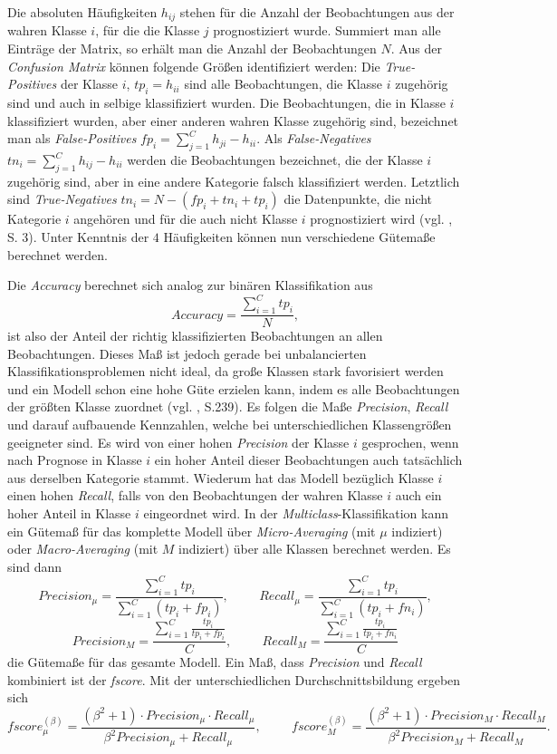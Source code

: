 \documentclass[a4paper,11pt]{article}
\begin{document}
Die absoluten Häufigkeiten $h_{ij}$ stehen für die Anzahl der Beobachtungen aus der wahren Klasse $i$, für die die Klasse $j$ prognostiziert wurde. Summiert man alle Einträge der Matrix, so erhält man die Anzahl der Beobachtungen $N$. Aus der \textit{Confusion Matrix} können folgende Größen identifiziert werden: Die \textit{True-Positives} der Klasse $i$, $tp_i = h_{ii}$ sind alle Beobachtungen, die Klasse $i$ zugehörig sind und auch in selbige klassifiziert wurden. Die Beobachtungen, die in Klasse $i$ klassifiziert wurden, aber einer anderen wahren Klasse zugehörig sind, bezeichnet man als \textit{False-Positives} $fp_i = \sum_{j = 1}^C h_{ji} - h_{ii}$. Als \textit{False-Negatives} $tn_i = \sum_{j = 1}^C h_{ij} - h_{ii}$ werden die Beobachtungen bezeichnet, die der Klasse $i$ zugehörig sind, aber in eine andere Kategorie falsch klassifiziert werden. Letztlich sind \textit{True-Negatives} $tn_i = N - (fp_i + tn_i + tp_i)$ die Datenpunkte, die nicht Kategorie $i$ angehören und für die auch nicht Klasse $i$ prognostiziert wird (vgl. \cite{sokolova}, S. 3). Unter Kenntnis der $4$ Häufigkeiten können nun verschiedene Gütemaße berechnet werden. 


Die \textit{Accuracy} berechnet sich analog zur binären Klassifikation aus 
\[ Accuracy = \frac{\sum_{i=1}^C tp_i}{N},  \]
ist also der Anteil der richtig klassifizierten Beobachtungen an allen Beobachtungen. Dieses Maß ist jedoch gerade bei unbalancierten Klassifikationsproblemen nicht ideal, da große Klassen stark favorisiert werden und ein Modell schon eine hohe Güte erzielen kann, indem es alle Beobachtungen der größten Klasse zuordnet (vgl. \cite{backhaus}, S.239). Es folgen die Maße \textit{Precision}, \textit{Recall} und darauf aufbauende Kennzahlen, welche bei unterschiedlichen Klassengrößen geeigneter sind. Es wird von einer hohen \textit{Precision} der Klasse $i$ gesprochen, wenn nach Prognose in Klasse $i$ ein hoher Anteil dieser Beobachtungen auch tatsächlich aus derselben Kategorie stammt. Wiederum hat das Modell bezüglich Klasse $i$ einen hohen \textit{Recall}, falls von den Beobachtungen der wahren Klasse $i$ auch ein hoher Anteil in Klasse $i$ eingeordnet wird.
In der \textit{Multiclass}-Klassifikation kann ein Gütemaß für das komplette Modell über \textit{Micro-Averaging} (mit $\mu$ indiziert) oder \textit{Macro-Averaging} (mit $M$ indiziert) über alle Klassen berechnet werden. Es sind dann 
\[ Precision_{\mu} = \frac{\sum_{i = 1}^C tp_i}{\sum_{i = 1}^C (tp_i + fp_i)}, \hspace{1cm} Recall_{\mu} = \frac{\sum_{i = 1}^C tp_i}{\sum_{i = 1}^C (tp_i + fn_i)},\]
\[ Precision_M = \frac{\sum_{i = 1}^C \frac{tp_i}{tp_i + fp_i} }{C}, \hspace{1cm} Recall_M = \frac{\sum_{i = 1}^C \frac{tp_i}{tp_i + fn_i} }{C}\]
die Gütemaße für das gesamte Modell. Ein Maß, dass \textit{Precision} und \textit{Recall} kombiniert ist der \textit{fscore}. Mit der unterschiedlichen Durchschnittsbildung ergeben sich
\[ fscore_{\mu}^{(\beta)} = \frac{(\beta^2+1) \cdot Precision_{\mu} \cdot Recall_{\mu}}{\beta^2 Precision_{\mu}+ Recall_{\mu}}, \hspace{1cm} fscore_{M}^{(\beta)} = \frac{(\beta^2+1) \cdot Precision_{M} \cdot Recall_{M}}{\beta^2 Precision_{M}+ Recall_{M}} . \]
\end{document}
